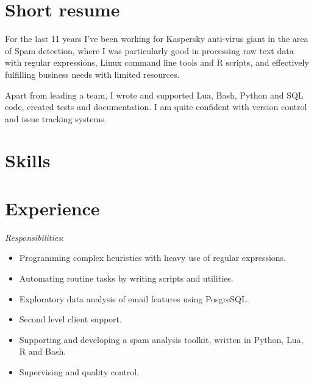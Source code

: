 \documentclass[11pt,a4paper,sans]{moderncv}        %
\newcommand{\responsibilities}[1]{ \emph{Responsibilities}:\begin{itemize} #1\end{itemize}}
\begin{document}
\makecvtitle

\section{Short resume}

For the last 11 years I've been working for Kaspersky anti-virus giant in the area of Spam detection, where I was particularly good in processing raw text data with regular expressions, Linux command line tools and R scripts, and effectively fulfilling business needs with limited resources.
\par\medskip
Apart from leading a team, I wrote and supported Lua, Bash, Python and SQL code, created tests and documentation. I am quite confident with version control and issue tracking systems. 



\section{Skills}



\section{Experience}

 {
    \responsibilities {
        \item Programming complex heuristics with heavy use of regular expressions.
        \item Automating routine tasks by writing scripts and utilities.
        \item Exploratory data analysis of email features using PosgreSQL.
        \item Second level client support.
	\item Supporting and developing a spam analysis toolkit, written in Python, Lua, R and Bash.
        \item Supervising and quality control.
    }
}
\end{document}
